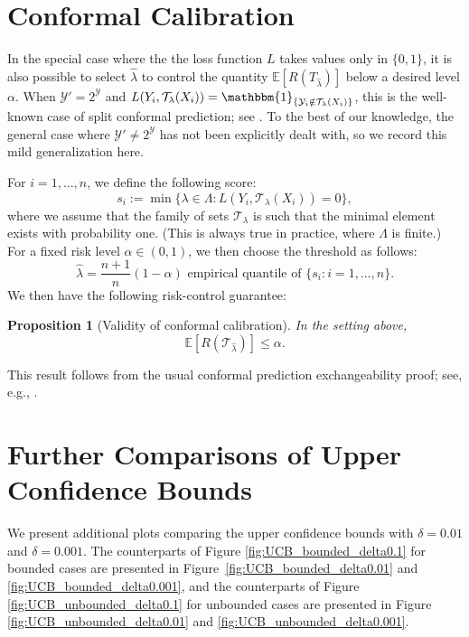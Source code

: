 \documentclass[10pt]{article}
\newtheorem{prop}{Proposition}
\def\E{\mathbb{E}}
\newcommand{\Y}{\mathcal{Y}}
\newcommand{\T}{\mathcal{T}}
\newcommand{\ind}[1]{\mathbbm{1}_{\left\{#1\right\}}}
\begin{document}
\section{Conformal Calibration}
In the special case where the the loss function $L$ takes values only in $\{0,1\}$, 
it is also possible to select $\hat{\lambda}$ to control the quantity $\E[R(T_{\hat{\lambda}})]$ below a desired level $\alpha$. When $\Y' = 2^\Y$ and  $L(Y_i,\T_\lambda(X_i)) = \ind{\Y_i \notin \T_\lambda(X_i)}$,  this is the well-known case of split conformal prediction; see \cite{gupta2020nested}. To the best of our knowledge, the general case where $\Y' \ne 2^\Y$ has not been explicitly dealt with, so we record this mild generalization here.

For $i = 1,\dots,n$, we define the following score:
\begin{equation*}
s_i := \min\{\lambda \in \Lambda : L(Y_i, \T_\lambda(X_i)) = 0\}, 
\end{equation*}
where we assume that the family of sets $\T_\lambda$ is such that the minimal element exists with probability one. (This is always true in practice, where $\Lambda$ is finite.) For a fixed risk level $\alpha \in (0,1)$, we then choose the threshold as follows: 
\begin{equation*}
\hat{\lambda} = \frac{n+1}{n}(1-\alpha)\text{ empirical quantile of } \{s_i : i = 1, \dots, n\}.
\end{equation*}
We then have the following risk-control guarantee:
\begin{prop}[Validity of conformal calibration]
\label{prop:coverage}
In the setting above,
\begin{equation*}
\E[R (\T_{\hat{\lambda}})] \le \alpha.
\end{equation*}
\end{prop}
This result follows from the usual conformal prediction exchangeability proof; see, e.g., \cite{romano2019conformalized}.

\section{Further Comparisons of Upper Confidence Bounds}
\label{app:additional_plots}

We present additional plots comparing the upper confidence bounds with $\delta = 0.01$ and $\delta = 0.001$. The counterparts of Figure \ref{fig:UCB_bounded_delta0.1} for bounded cases are presented in Figure~\ref{fig:UCB_bounded_delta0.01} and \ref{fig:UCB_bounded_delta0.001}, and the counterparts of Figure \ref{fig:UCB_unbounded_delta0.1} for unbounded cases are presented in Figure \ref{fig:UCB_unbounded_delta0.01} and \ref{fig:UCB_unbounded_delta0.001}.
\end{document}
